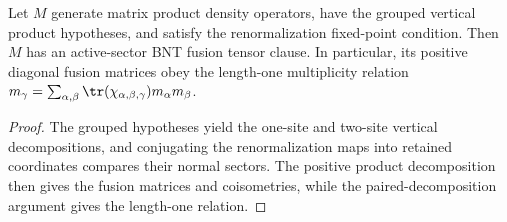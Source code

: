 \begin{lemma}%
    \label{thm:mpdo_grouped_product_inputs_to_bnt_fusion_tensor}
    \leanok
    Let $M$ generate matrix product density operators, have the grouped
    vertical product hypotheses, and satisfy the renormalization fixed-point
    condition. Then $M$ has an active-sector BNT fusion tensor clause. In
    particular, its positive diagonal fusion matrices obey the length-one
    multiplicity relation
    $m_\gamma=\sum_{\alpha,\beta}
        \tr(\chi_{\alpha,\beta,\gamma})m_\alpha m_\beta$.
\end{lemma}

\begin{proof}\leanok
    The grouped hypotheses yield the one-site and two-site vertical
    decompositions, and conjugating the renormalization maps into retained
    coordinates compares their normal sectors. The positive product
    decomposition then gives the fusion matrices and coisometries, while the
    paired-decomposition argument gives the length-one relation.
\end{proof}


